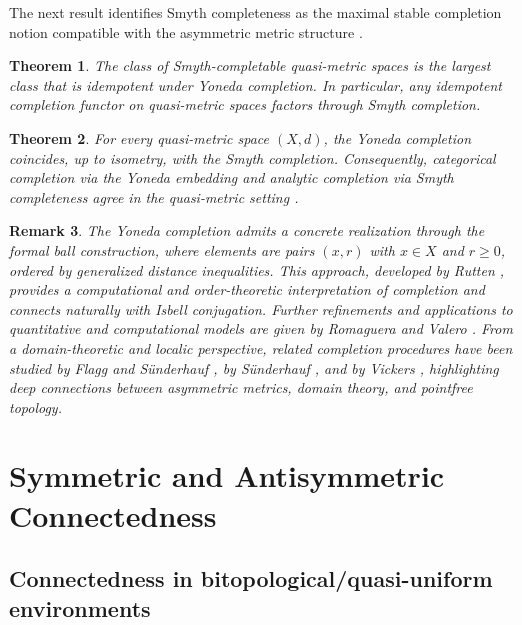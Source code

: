 \documentclass[preprint,12pt]{elsarticle}
\newtheorem{theorem}{Theorem}[section]
\newtheorem{remark}[theorem]{Remark}
\begin{document}
\noindent
The next result identifies Smyth completeness as the maximal stable
completion notion compatible with the asymmetric metric structure
\cite{Kunzi2001}.

\begin{theorem}
\label{thm:idempotent-yoneda}
The class of Smyth-completable quasi-metric spaces is the largest class
that is idempotent under Yoneda completion. In particular, any
idempotent completion functor on quasi-metric spaces factors through
Smyth completion.
\end{theorem}

\begin{theorem}
\label{thm:yoneda-equals-smyth}
For every quasi-metric space $(X,d)$, the Yoneda completion coincides,
up to isometry, with the Smyth completion. Consequently, categorical
completion via the Yoneda embedding and analytic completion via Smyth
completeness agree in the quasi-metric setting
\cite{Kunzi2001,KunziSchellekens2002}.
\end{theorem}

\begin{remark}
\label{rem:formal-balls}
The Yoneda completion admits a concrete realization through the
\emph{formal ball construction}, where elements are pairs $(x,r)$ with
$x\in X$ and $r\ge 0$, ordered by generalized distance inequalities.
This approach, developed by Rutten \cite{Rutten1998}, provides a
computational and order-theoretic interpretation of completion and
connects naturally with Isbell conjugation. Further refinements and
applications to quantitative and computational models are given by
Romaguera and Valero
\cite{RomagueraTiradoValero2012,RomagueraValero2009}.
From a domain-theoretic and localic perspective, related completion
procedures have been studied by Flagg and S\"underhauf
\cite{FlaggSuenderhauf2002,FlaggSuenderhaufWagner1997}, by S\"underhauf
\cite{Sunderhauf1997,Sunderhauf1998}, and by Vickers \cite{Vickers1997},
highlighting deep connections between asymmetric metrics, domain theory,
and pointfree topology.
\end{remark}


\section{Symmetric and Antisymmetric Connectedness}
\label{sec:sym-antisym-connectedness}

\subsection{Connectedness in bitopological/quasi-uniform environments}
\label{ssec:conn-bitopo}
\end{document}
